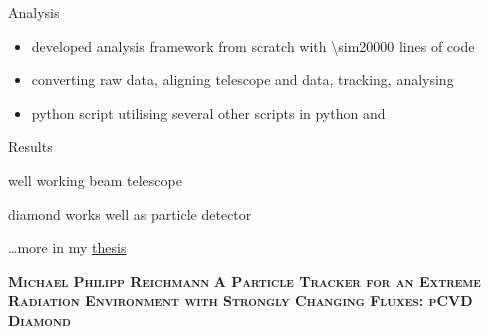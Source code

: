\begin{frame}{Analysis}
%
  \begin{subfigures}
  \end{subfigures}
%
  \begin{itemize}\itemfill
    \item developed analysis framework from scratch with \num{\sim20000} lines of code
    \item converting raw data, aligning telescope and data, tracking, analysing
    \item python script utilising several other scripts in python and \cpp
  \end{itemize}
%
\end{frame}
\begin{frame}{Results}\centering
%
  \begin{tbox}[.7]
    \item well working beam telescope
    \item diamond works well as particle detector
    \item \ldots more in my \href{https://doi.org/10.3929/ethz-b-000611857}{thesis}
  \end{tbox}
  \setsansfont{Lato}
  \begin{center}
    \begin{tcolorbox}[colback=red!5!white, colframe=white!70!red, width=.92\textwidth, arc=4mm, halign=center, valign=center]
      \textbf{\textsc{Michael Philipp Reichmann}}
      \tcblower
      \huge\centering
      \textcolor{chapter-color}{\textbf{\textsc{A Particle Tracker for an Extreme Radiation Environment with Strongly Changing Fluxes: pCVD Diamond}}}
    \end{tcolorbox}
  \end{center}
%
\end{frame}
